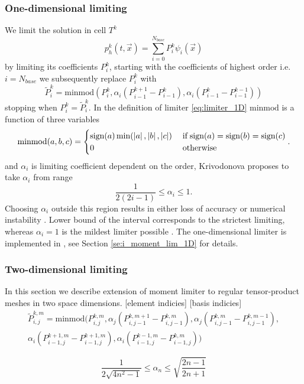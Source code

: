\subsubsection{One-dimensional limiting}
\label{sse:moment_lim_1D}
We limit the solution in cell $T^k$
\begin{equation}
\label{eq:el_lin_comb_lim}
p_h^k(t, \vec{x}) = \sum\limits_{i=0}^{N_{base}} P_i^k\psi_i(\vec{x})
\end{equation}
by limiting its coefficients $P_i^k$, starting with the coefficients of 
highest order i.e. $i = N_{base}$ we subsequently replace 
$P_i^k$ with
\begin{equation}
\label{eq:limiter_1D}
	\tilde{P}_i^k = \text{minmod}\left(P_i^k, 
						\alpha_i(P_{i-1}^{k+1} - P_{i-1}^k), 
						\alpha_i (P_{i-1}^k - P_{i-1}^{k-1})\right)
\end{equation}
stopping when $P_i^k = \tilde{P}_i^k$. In the definition of limiter \eqref{eq:limiter_1D} 
$\text{minmod}$ is a function of three 
variables
\begin{equation}
	\text{minmod}(a,b,c) = 
	\begin{cases}
			\text{sign}(a)\min(\left\lvert a\right\rvert, \left\lvert b\right\rvert, \left\lvert c\right\rvert) & \;\text{if}\; 	
															\text{sign}(a) =
															\text{sign}(b) = 
															\text{sign}(c)\\
														0 & \;\text{otherwise}
	\end{cases}.
\end{equation}
and $\alpha_i$ is limiting coefficient dependent on the order, Krivodonova 
\cite{Krivodonova2007} proposes to take $\alpha_i$ from range
\begin{equation}
	\frac{1}{2(2i -1)} \leq \alpha_i \leq 1.
\end{equation}
Choosing $\alpha_i$ outside this region results in either loss of accuracy or numerical 
instability \cite[p. 882]{Krivodonova2007}. Lower bound of the interval corresponds to 
the strictest limiting, whereas $\alpha_i = 1$ is the mildest limiter possible \cite[p. 
882]{Krivodonova2007}. The one-dimensional limiter is implemented in 
, see Section \ref{se:i_moment_lim_1D} for details.

\subsubsection{Two-dimensional limiting}
In this section we describe extension of moment limiter to regular tensor-product meshes 
in two 
space dimensions.
[\todo element indicies]
[\todo basis indicies]
\begin{multline}
\tilde{P}^{k,m}_{i,j} =
	\text{minmod}\big(P^{k,m}_{i,j}, 
					  \alpha_j(P^{k,m+1}_{i,j-1} - P^{k,m}_{i,j-1}),
					  \alpha_j(P^{k,m}_{i,j-1} - P^{k,m-1}_{i,j-1}),\\
					  \alpha_i(P^{k+1,m}_{i-1,j} - P^{k+1,m}_{i-1,j}),
					  \alpha_i(P^{k-1,m}_{i-1,j} - P^{k,m}_{i-1,j})\big)
\end{multline}


\begin{equation}
	\frac{1}{2\sqrt{4n^2 - 1}} \leq \alpha_n \leq \sqrt{\frac{2n - 1}{2n + 1}}
\end{equation} 



